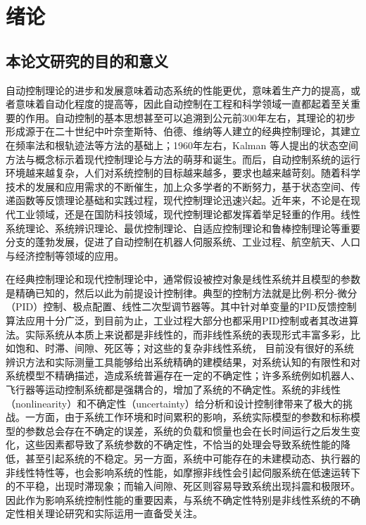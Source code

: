 \chapter{绪论}
\label{chap:intro}
\section{本论文研究的目的和意义}

自动控制理论的进步和发展意味着动态系统的性能更优，意味着生产力的提高，或者意味着自动化程度的提高等，因此自动控制在工程和科学领域一直都起着至关重要的作用。自动控制的基本思想甚至可以追溯到公元前300年左右，其理论的初步形成源于在二十世纪中叶奈奎斯特、伯德、维纳等人建立的经典控制理论，其建立在频率法和根轨迹法等方法的基础上；1960年左右，Kalman 等人提出的状态空间方法与概念标示着现代控制理论与方法的萌芽和诞生。而后，自动控制系统的运行环境越来越复杂，人们对系统控制的目标越来越多，要求也越来越苛刻。随着科学技术的发展和应用需求的不断催生，加上众多学者的不断努力，基于状态空间、传递函数等反馈理论基础和实践过程，现代控制理论迅速兴起。近年来，不论是在现代工业领域，还是在国防科技领域，现代控制理论都发挥着举足轻重的作用。线性系统理论、系统辨识理论、最优控制理论、自适应控制理论和鲁棒控制理论等重要分支的蓬勃发展，促进了自动控制在机器人伺服系统、工业过程、航空航天、人口与经济控制等领域的应用。

在经典控制理论和现代控制理论中，通常假设被控对象是线性系统并且模型的参数是精确已知的，然后以此为前提设计控制律。典型的控制方法就是比例-积分-微分（PID）控制、极点配置、线性二次型调节器等。其中针对单变量的PID反馈控制算法应用十分广泛，到目前为止，工业过程大部分也都采用PID控制或者其改进算法。实际系统从本质上来说都是非线性的，而非线性系统的表现形式丰富多彩，比如饱和、时滞、间隙、死区等；对这些的复杂非线性系统， 目前没有很好的系统辨识方法和实际测量工具能够给出系统精确的建模结果，对系统认知的有限性和对系统模型不精确描述，造成系统普遍存在一定的不确定性；许多系统例如机器人、飞行器等运动控制系统都是强耦合的，增加了系统的不确定性。系统的非线性（nonlinearity）和不确定性（uncertainty）给分析和设计控制律带来了极大的挑战。一方面，由于系统工作环境和时间累积的影响，系统实际模型的参数和标称模型的参数总会存在不确定的误差，系统的负载和惯量也会在长时间运行之后发生变化，这些因素都导致了系统参数的不确定性，不恰当的处理会导致系统性能的降低，甚至引起系统的不稳定。另一方面，系统中可能存在的未建模动态、执行器的非线性特性等，也会影响系统的性能，如摩擦非线性会引起伺服系统在低速运转下的不平稳，出现时滞现象；而输入间隙、死区则容易导致系统出现抖震和极限环。因此作为影响系统控制性能的重要因素，与系统不确定性特别是非线性系统的不确定性相关理论研究和实际运用一直备受关注。

